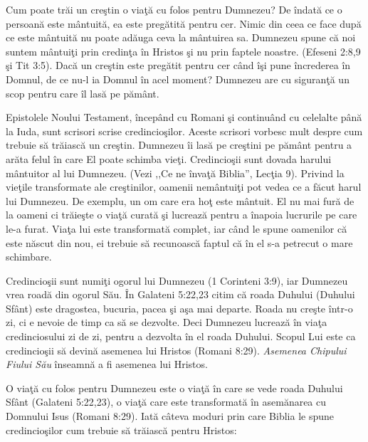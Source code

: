 \newpage


Cum poate trăi un creştin o viaţă cu folos pentru Dumnezeu? De îndată ce o persoană este mântuită, ea este pregătită pentru cer. Nimic din ceea ce face după ce este mântuită nu poate adăuga ceva la mântuirea sa. Dumnezeu spune că noi suntem mântuiţi prin credinţa în Hristos şi nu prin faptele noastre. (Efeseni 2:8,9 şi Tit 3:5). Dacă un creştin este pregătit pentru cer când îşi pune încrederea în Domnul, de ce nu-l ia Domnul în acel moment? Dumnezeu are cu siguranţă un scop pentru care îl lasă pe pământ.

Epistolele Noului Testament, începând cu Romani şi continuând cu celelalte până la Iuda, sunt scrisori scrise credincioşilor. Aceste scrisori vorbesc mult despre cum trebuie să trăiască un creştin. Dumnezeu îi lasă pe creştini pe pământ pentru a arăta felul în care El poate schimba vieţi. Credincioşii sunt dovada harului mântuitor al lui Dumnezeu. (Vezi ,,Ce ne învaţă Biblia'', Lecţia 9). Privind la vieţile transformate ale creştinilor, oamenii nemântuiţi pot vedea ce a făcut harul lui Dumnezeu. De exemplu, un om care era hoţ este mântuit. El nu mai fură de la oameni ci trăieşte o viaţă curată şi lucrează pentru a înapoia lucrurile pe care le-a furat. Viaţa lui este transformată complet, iar când le spune oamenilor că este născut din nou, ei trebuie să recunoască faptul că în el s-a petrecut o mare schimbare.  

Credincioşii sunt numiţi ogorul lui Dumnezeu (1 Corinteni 3:9), iar Dumnezeu vrea roadă din ogorul Său. În Galateni 5:22,23 citim că roada Duhului (Duhului Sfânt) este dragostea, bucuria, pacea şi aşa mai departe. Roada nu creşte într-o zi, ci e nevoie de timp ca să se dezvolte. Deci Dumnezeu lucrează în viaţa credinciosului zi de zi, pentru a dezvolta în el roada Duhului. Scopul Lui este ca credincioşii să devină asemenea lui Hristos (Romani 8:29). \textit{Asemenea Chipului Fiului Său} înseamnă a fi asemenea lui Hristos. 

       O viaţă cu folos pentru Dumnezeu este o viaţă în care se vede roada Duhului Sfânt (Galateni 5:22,23), o viaţă care este transformată în asemănarea cu Domnului Isus (Romani 8:29). Iată câteva moduri prin care Biblia le spune credincioşilor cum trebuie să trăiască pentru Hristos:
       
